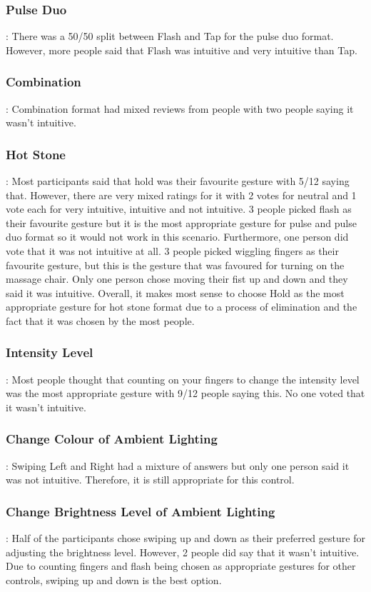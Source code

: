\documentclass{l4proj}
\begin{document}
\subsubsection{Pulse Duo}: There was a 50/50 split between Flash and Tap for the pulse duo format. However, more people said that Flash was intuitive and very intuitive than Tap.
\subsubsection{Combination}: Combination format had mixed reviews from people with two people saying it wasn't intuitive.
\subsubsection{Hot Stone}: Most participants said that hold was their favourite gesture with 5/12 saying that. However, there are very mixed ratings for it with 2 votes for neutral and 1 vote each for very intuitive, intuitive and not intuitive.
3 people picked flash as their favourite gesture but it is the most appropriate gesture for pulse and pulse duo format so it would not work in this scenario. Furthermore, one person did vote that it was not intuitive at all.
3 people picked wiggling fingers as their favourite gesture, but this is the gesture that was favoured for turning on the massage chair.
Only one person chose moving their fist up and down and they said it was intuitive.
Overall, it makes most sense to choose Hold as the most appropriate gesture for hot stone format due to a process of elimination and the fact that it was chosen by the most people.
\subsubsection{Intensity Level}: Most people thought that counting on your fingers to change the intensity level was the most appropriate gesture with 9/12 people saying this. No one voted that it wasn't intuitive.
\subsubsection{Change Colour of Ambient Lighting}: Swiping Left and Right had a mixture of answers but only one person said it was not intuitive. Therefore, it is still appropriate for this control.
\subsubsection{Change Brightness Level of Ambient Lighting}: Half of the participants chose swiping up and down as their preferred gesture for adjusting the brightness level. However, 2 people did say that it wasn't intuitive.\\
Due to counting fingers and flash being chosen as appropriate gestures for other controls, swiping up and down is the best option.
\end{document}
